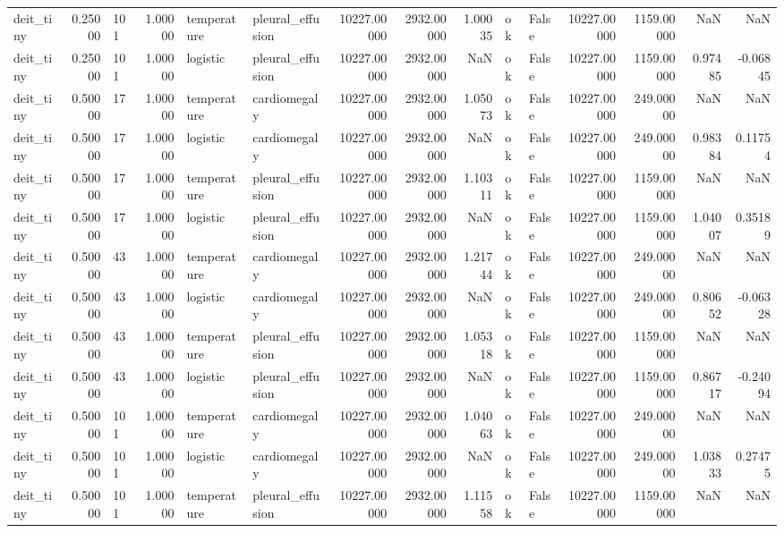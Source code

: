 \begin{tabular}{lrlrllrrrllrrrr}
deit\_tiny & 0.25000 & 101 & 1.00000 & temperature & pleural\_effusion & 10227.00000 & 2932.00000 & 1.00035 & ok & False & 10227.00000 & 1159.00000 & NaN & NaN \\
deit\_tiny & 0.25000 & 101 & 1.00000 & logistic & pleural\_effusion & 10227.00000 & 2932.00000 & NaN & ok & False & 10227.00000 & 1159.00000 & 0.97485 & -0.06845 \\
deit\_tiny & 0.50000 & 17 & 1.00000 & temperature & cardiomegaly & 10227.00000 & 2932.00000 & 1.05073 & ok & False & 10227.00000 & 249.00000 & NaN & NaN \\
deit\_tiny & 0.50000 & 17 & 1.00000 & logistic & cardiomegaly & 10227.00000 & 2932.00000 & NaN & ok & False & 10227.00000 & 249.00000 & 0.98384 & 0.11754 \\
deit\_tiny & 0.50000 & 17 & 1.00000 & temperature & pleural\_effusion & 10227.00000 & 2932.00000 & 1.10311 & ok & False & 10227.00000 & 1159.00000 & NaN & NaN \\
deit\_tiny & 0.50000 & 17 & 1.00000 & logistic & pleural\_effusion & 10227.00000 & 2932.00000 & NaN & ok & False & 10227.00000 & 1159.00000 & 1.04007 & 0.35189 \\
deit\_tiny & 0.50000 & 43 & 1.00000 & temperature & cardiomegaly & 10227.00000 & 2932.00000 & 1.21744 & ok & False & 10227.00000 & 249.00000 & NaN & NaN \\
deit\_tiny & 0.50000 & 43 & 1.00000 & logistic & cardiomegaly & 10227.00000 & 2932.00000 & NaN & ok & False & 10227.00000 & 249.00000 & 0.80652 & -0.06328 \\
deit\_tiny & 0.50000 & 43 & 1.00000 & temperature & pleural\_effusion & 10227.00000 & 2932.00000 & 1.05318 & ok & False & 10227.00000 & 1159.00000 & NaN & NaN \\
deit\_tiny & 0.50000 & 43 & 1.00000 & logistic & pleural\_effusion & 10227.00000 & 2932.00000 & NaN & ok & False & 10227.00000 & 1159.00000 & 0.86717 & -0.24094 \\
deit\_tiny & 0.50000 & 101 & 1.00000 & temperature & cardiomegaly & 10227.00000 & 2932.00000 & 1.04063 & ok & False & 10227.00000 & 249.00000 & NaN & NaN \\
deit\_tiny & 0.50000 & 101 & 1.00000 & logistic & cardiomegaly & 10227.00000 & 2932.00000 & NaN & ok & False & 10227.00000 & 249.00000 & 1.03833 & 0.27475 \\
deit\_tiny & 0.50000 & 101 & 1.00000 & temperature & pleural\_effusion & 10227.00000 & 2932.00000 & 1.11558 & ok & False & 10227.00000 & 1159.00000 & NaN & NaN \\

\end{tabular}
